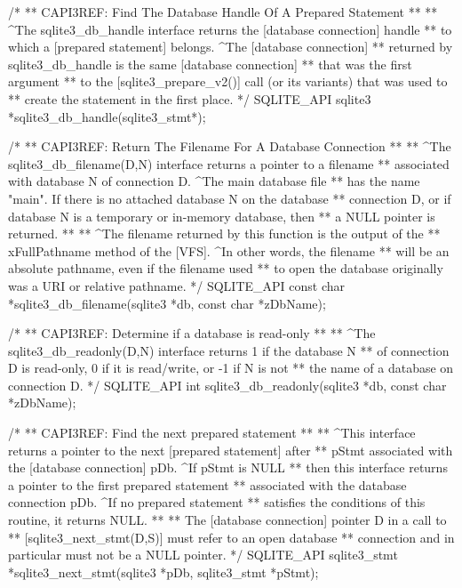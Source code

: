 \begin{Codex}[label=sqlite3.h,numbers=left]
{/*
** CAPI3REF: Find The Database Handle Of A Prepared Statement
**
** ^The sqlite3_db_handle interface returns the [database connection] handle
** to which a [prepared statement] belongs.  ^The [database connection]
** returned by sqlite3_db_handle is the same [database connection]
** that was the first argument
** to the [sqlite3_prepare_v2()] call (or its variants) that was used to
** create the statement in the first place.
*/
SQLITE_API sqlite3 *sqlite3_db_handle(sqlite3_stmt*);

/*
** CAPI3REF: Return The Filename For A Database Connection
**
** ^The sqlite3_db_filename(D,N) interface returns a pointer to a filename
** associated with database N of connection D.  ^The main database file
** has the name "main".  If there is no attached database N on the database
** connection D, or if database N is a temporary or in-memory database, then
** a NULL pointer is returned.
**
** ^The filename returned by this function is the output of the
** xFullPathname method of the [VFS].  ^In other words, the filename
** will be an absolute pathname, even if the filename used
** to open the database originally was a URI or relative pathname.
*/
SQLITE_API const char *sqlite3_db_filename(sqlite3 *db, const char *zDbName);

/*
** CAPI3REF: Determine if a database is read-only
**
** ^The sqlite3_db_readonly(D,N) interface returns 1 if the database N
** of connection D is read-only, 0 if it is read/write, or -1 if N is not
** the name of a database on connection D.
*/
SQLITE_API int sqlite3_db_readonly(sqlite3 *db, const char *zDbName);

/*
** CAPI3REF: Find the next prepared statement
**
** ^This interface returns a pointer to the next [prepared statement] after
** pStmt associated with the [database connection] pDb.  ^If pStmt is NULL
** then this interface returns a pointer to the first prepared statement
** associated with the database connection pDb.  ^If no prepared statement
** satisfies the conditions of this routine, it returns NULL.
**
** The [database connection] pointer D in a call to
** [sqlite3_next_stmt(D,S)] must refer to an open database
** connection and in particular must not be a NULL pointer.
*/
SQLITE_API sqlite3_stmt *sqlite3_next_stmt(sqlite3 *pDb, sqlite3_stmt *pStmt);

}
\end{Codex}
